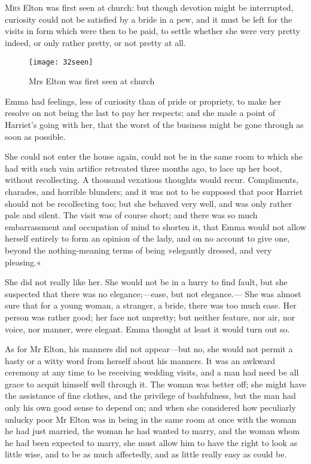 \chapter[Chapter \thechapter]{}
\lettrine[lines=4,lraise=0.3]{M}{rs} Elton was first seen at church: but though devotion might be interrupted, curiosity could not be satisfied by a bride in a pew, and it must be left for the visits in form which were then to be paid, to settle whether she were very pretty indeed, or only rather pretty, or not pretty at all.


\begin{figure}[tbph]
\centering
\texttt{[image: 32seen]}
\caption{Mrs Elton was first seen at church}
\end{figure}

Emma had feelings, less of curiosity than of pride or propriety, to make her resolve on not being the last to pay her respects; and she made a point of Harriet's going with her, that the worst of the business might be gone through as soon as possible.

She could not enter the house again, could not be in the same room to which she had with such vain artifice retreated three months ago, to lace up her boot, without recollecting. A thousand vexatious thoughts would recur. Compliments, charades, and horrible blunders; and it was not to be supposed that poor Harriet should not be recollecting too; but she behaved very well, and was only rather pale and silent. The visit was of course short; and there was so much embarrassment and occupation of mind to shorten it, that Emma would not allow herself entirely to form an opinion of the lady, and on no account to give one, beyond the nothing-meaning terms of being »elegantly dressed, and very pleasing.«

She did not really like her. She would not be in a hurry to find fault, but she suspected that there was no elegance;—ease, but not elegance.— She was almost sure that for a young woman, a stranger, a bride, there was too much ease. Her person was rather good; her face not unpretty; but neither feature, nor air, nor voice, nor manner, were elegant. Emma thought at least it would turn out so.

As for Mr Elton, his manners did not appear—but no, she would not permit a hasty or a witty word from herself about his manners. It was an awkward ceremony at any time to be receiving wedding visits, and a man had need be all grace to acquit himself well through it. The woman was better off; she might have the assistance of fine clothes, and the privilege of bashfulness, but the man had only his own good sense to depend on; and when she considered how peculiarly unlucky poor Mr Elton was in being in the same room at once with the woman he had just married, the woman he had wanted to marry, and the woman whom he had been expected to marry, she must allow him to have the right to look as little wise, and to be as much affectedly, and as little really easy as could be.

